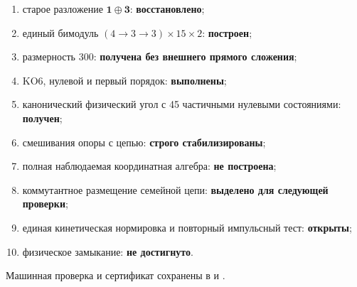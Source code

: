 \begin{protocol}
\begin{enumerate}
 \item старое разложение $\mathbf1\oplus\mathbf3$:
 \textbf{восстановлено};
 \item единый бимодуль $(4\to3\to3)\times15\times2$:
 \textbf{построен};
 \item размерность 300:
 \textbf{получена без внешнего прямого сложения};
 \item KO6, нулевой и первый порядок:
 \textbf{выполнены};
 \item канонический физический угол с 45 частичными нулевыми состояниями:
 \textbf{получен};
 \item смешивания опоры с цепью:
 \textbf{строго стабилизированы};
 \item полная наблюдаемая координатная алгебра:
 \textbf{не построена};
 \item коммутантное размещение семейной цепи:
 \textbf{выделено для следующей проверки};
 \item единая кинетическая нормировка и повторный импульсный тест:
 \textbf{открыты};
 \item физическое замыкание:
 \textbf{не достигнуто}.
\end{enumerate}
\end{protocol}

Машинная проверка и сертификат сохранены в
 и
.